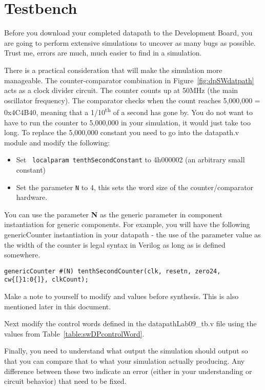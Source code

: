 \section{Testbench}

Before you download your completed datapath to the Development Board,
you are going to perform extensive simulations to uncover as many bugs
as possible. Trust me, errors are much, much easier to find in a
simulation.

There is a practical consideration that will make the simulation more
manageable. The counter-comparator combination in Figure~\ref{fig:dpSWdatpath} acts as a
clock divider circuit. The counter counts up at 50MHz (the main
oscillator frequency). The comparator checks when the count reaches
5,000,000 = 0x4C4B40, meaning that a 1/10\textsuperscript{th} of a
second has gone by. You do not want to have to run the counter to
5,000,000 in your simulation, it would just take too long. To replace
the 5,000,000 constant you need to go into the datapath.v module and
modify the following:

\begin{itemize}
\item
Set \verb+ localparam tenthSecondConstant+ to 4\textquotesingle h000002
  (an arbitrary small constant)
\item
  Set the parameter \verb+N+ to 4, this sets the word size of the counter/comparator hardware.
\end{itemize}

You can use the parameter \textbf{N} as the generic parameter in
component instantiation for generic components. For example, 
you will have the following genericCounter instantiation in your 
datapath - the use of the parameter value  as the width of the 
counter is legal syntax in Verilog as long as  is defined somewhere.

\begin{verbatim}
genericCounter #(N) tenthSecondCounter(clk, resetn, zero24, cw{[}1:0{]}, clkCount);
\end{verbatim}

Make a note to yourself to modify  and
 values before synthesis. This is also
mentioned later in this document.

Next modify the control words defined in the datapathLab09\_tb.v file
using the values from Table~\ref{table:swDPcontrolWord}.

Finally, you need to understand what output the simulation should output
so that you can compare that to what your simulation actually producing.
Any difference between these two indicate an error (either in your
understanding or circuit behavior) that need to be fixed.

